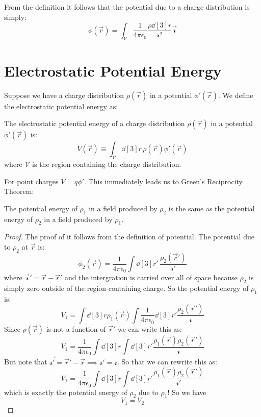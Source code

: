 From the definition it follows that the potential due to a charge distribution is simply:
\[
\phi(\vec{r}) = \int_{\mathcal{V}} \frac{1}{4\pi\epsilon_0} \frac{\rho \dd[3]r}{\mathscr{r}^2} \vec{\mathscr{r}}
\]

\section{Electrostatic Potential Energy}    

Suppose we have a charge distribution $\rho(\vec{r})$ in a potential $\phi'(\vec{r})$. We define the electrostatic 
potential energy as:

\begin{definition}
    The electrostatic potential energy of a charge distribution $\rho(\vec{r})$ in a potential $\phi'(\vec{r})$ is:
    \begin{equation}
        V(\vec{r}) \equiv \int_{\mathcal{V}} \dd[3]r \, \rho(\vec{r}) \phi'(\vec{r})
    \end{equation} 
    where $\mathcal{V}$ is the region containing the charge distribution.
\end{definition}

For point charges $V = q\phi'$. This immediately leads us to Green's Reciprocity Theorem:

\begin{theorem}
    The potential energy of $\rho_1$ in a field produced by $\rho_2$ is the same as the potential 
    energy of $\rho_2$ in a field produced by $\rho_1$.
\end{theorem}

\begin{proof}
    The proof of it follows from the definition of potential. The potential due to $\rho_2$ at $\vec{r}$ is:
    \[
    \phi_2(\vec{r})  = \frac{1}{4\pi\epsilon_0} \int \dd[3]{r'} \, \frac{\rho_2(\vec{r}')}{\mathscr{r}'}
    \]
    where $\vec{\mathscr{r}}' = \vec{r}  - \vec{r}'$ and the intergration is carried over all of space because 
    $\rho_2$ is simply zero outside of the region containing charge. So the potential energy of $\rho_1$ is:
    \[
    V_1 = \int \dd[3]{r} \rho_1(\vec{r}) \int \frac{1}{4\pi\epsilon_0} \dd[3]{r'} \frac{\rho_2(\vec{r}')}{\mathscr{r}}
    \]
    Since $\rho(\vec{r})$ is not a function of $\vec{r}'$ we can write this as:
    \[
    V_1 = \frac{1}{4\pi\epsilon_0} \int \dd[3]{r} \int \dd[3]{r'} \frac{\rho_1(\vec{r})\rho_2(\vec{r}')}{\mathscr{r}}
    \]
    But note that $\vec{\mathscr{r}'} = \vec{r}' - \vec{r} \implies \mathscr{r}' = \mathscr{r}$. So that we can rewrite this as:
    \[
    V_1 = \frac{1}{4\pi\epsilon_0} \int \dd[3]{r} \int \dd[3]{r'} \frac{\rho_1(\vec{r})\rho_2(\vec{r}')}{\mathscr{r}'}
    \]
    which is exactly the potential energy of $\rho_2$ due to $\rho_1$! So we have
    \begin{equation}
        V_1 = V_2
    \end{equation}
\end{proof}

